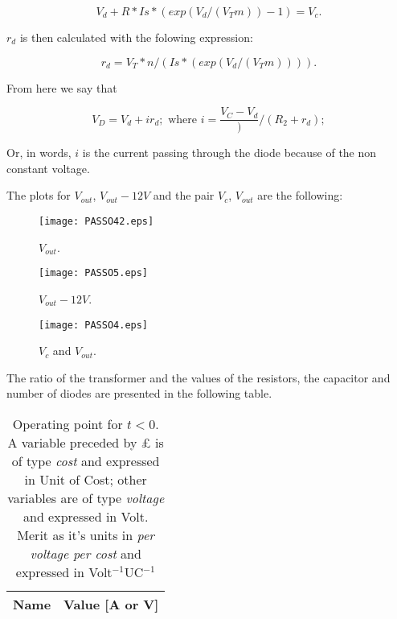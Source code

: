 \begin{equation}
  V_d + R*Is*(exp(V_d/(V_Tm))-1) = V_c.
  \label{eq:Vd}
\end{equation}

$r_{d}$ is then calculated with the folowing expression:

\begin{equation}
  r_{d} = V_T*n/( Is*(exp(V_d/(V_Tm)))).
  \label{eq:Rd}
\end{equation}

From here we say that

\begin{equation}
  V_{D} = V_d + ir_d; \text{ where } i = \frac{V_C-V_d})/(R_2+r_d);
  \label{eq:TEO_VD}
\end{equation}

Or, in words, $i$ is the current passing through the diode because of the non constant voltage.

The plots for $V_{out}$, $V_{out} - 12V$ and the pair $V_c$, $V_{out}$ are the following:

\begin{figure}[h] \centering
\texttt{[image: PASSO42.eps]}
\caption{$V_{out}$.}
\label{fig:TEO_OUT}
\end{figure}

\begin{figure}[h] \centering
\texttt{[image: PASSO5.eps]}
\caption{$V_{out} - 12V$.}
\label{fig:TEO_OUT-12}
\end{figure}

\begin{figure}[h] \centering
\texttt{[image: PASSO4.eps]}
\caption{$V_c$ and $V_{out}$.}
\label{fig:TEO_OUT-12}
\end{figure}

The ratio of the transformer and the values of the resistors, the capacitor and number of diodes are presented in the following table.

\begin{table}[h]
  \centering
  \begin{tabular}{|l|r|}
    \hline    
    {\bf Name} & {\bf Value [A or V]} \\ \hline
    
  \end{tabular}
  \caption{Operating point for $t<0$. A variable preceded by £ is of type {\it cost} and expressed in Unit of Cost; other variables are of type {\it voltage} and expressed in Volt. Merit as it's units in {\it per voltage per cost} and expressed in Volt$^{-1}$UC$^{-1}$ }
  \label{tab:SIM_RESULTADOS}
\end{table}